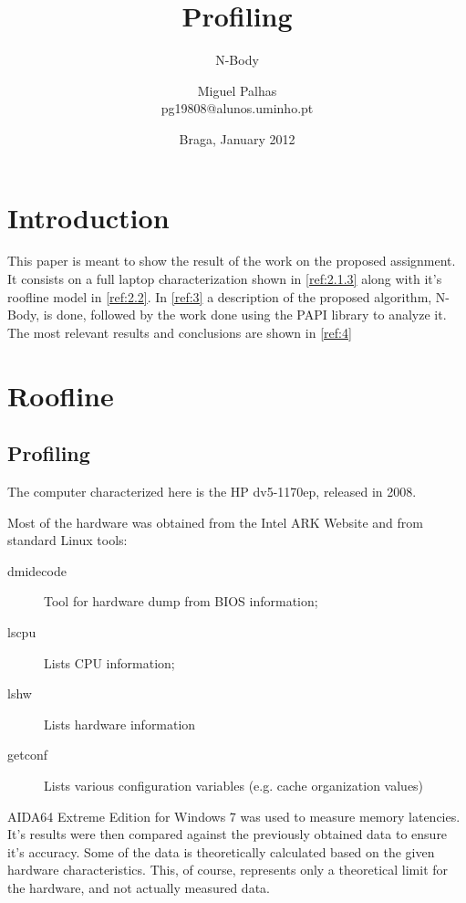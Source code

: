 \documentclass[twocolumn,10pt]{scrartcl}
\title{Profiling}
\subtitle{N-Body}
\author{Miguel Palhas\\pg19808@alunos.uminho.pt}
\date{Braga, January 2012}
\begin{document}
\maketitle

\section{Introduction}

This paper is meant to show the result of the work on the proposed assignment. It consists on a full laptop characterization shown in \autoref{ref:2.1.3} along with it's roofline model in \autoref{ref:2.2}. In \autoref{ref:3} a description of the proposed algorithm, N-Body, is done, followed by the work done using the PAPI library to analyze it. The most relevant results and conclusions are shown in \autoref{ref:4}

\section{Roofline}

\subsection{Profiling}
The computer characterized here is the HP dv5-1170ep, released in 2008.

Most of the hardware was obtained from the Intel ARK Website \cite{ark} and from standard Linux tools:
\begin{description}
\item[dmidecode] Tool for hardware dump from BIOS information;
\item[lscpu] Lists CPU information;
\item[lshw] Lists hardware information
\item[getconf] Lists various configuration variables (e.g. cache organization values)
\end{description}

AIDA64 Extreme Edition for Windows 7 was used to measure memory latencies. It's results were then compared against the previously obtained data to ensure it's accuracy.
Some of the data is theoretically calculated based on the given hardware characteristics. This, of course, represents only a theoretical limit for the hardware, and not actually measured data.
\end{document}
